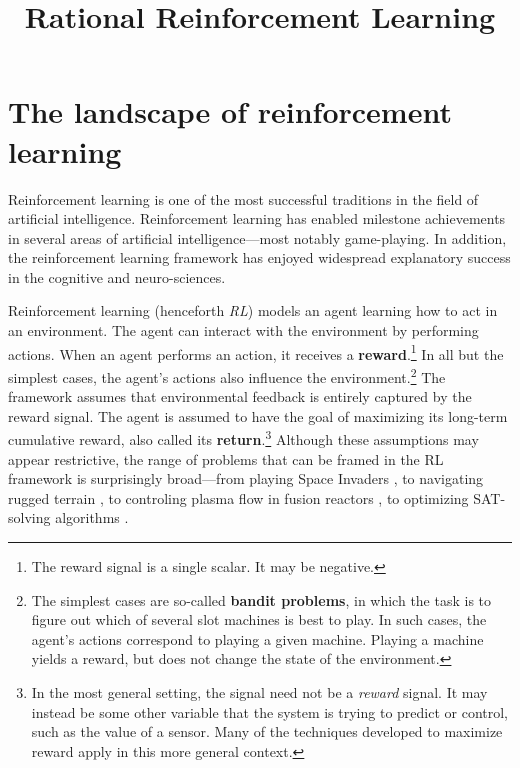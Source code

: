 \documentclass{my-tufte}
\title{Rational Reinforcement Learning}
\begin{document}
\maketitle

\section{The landscape of reinforcement learning}

Reinforcement learning is one of the most successful traditions in the field of artificial intelligence.
Reinforcement learning has enabled milestone achievements in several areas of artificial intelligence---most notably game-playing.
In addition, the reinforcement learning framework has enjoyed widespread explanatory success in the cognitive and neuro-sciences.

Reinforcement learning (henceforth \emph{RL}) models an agent learning how to act in an environment.
The agent can interact with the environment by performing actions.
When an agent performs an action, it receives a \textbf{reward}.\footnote{The reward signal is a single scalar. It may be negative.}
In all but the simplest cases, the agent's actions also influence the environment.\footnote{The simplest cases are so-called \textbf{bandit problems}, in which the task is to figure out which of several slot machines is best to play. In such cases, the agent's actions correspond to playing a given machine. Playing a machine yields a reward, but does not change the state of the environment.}
The framework assumes that environmental feedback is entirely captured by the reward signal.
The agent is assumed to have the goal of maximizing its long-term cumulative reward, also called its \textbf{return}.\footnote{In the most general setting, the signal need not be a \emph{reward} signal. It may instead be some other variable that the system is trying to predict or control, such as the value of a sensor. Many of the techniques developed to maximize reward apply in this more general context.}
Although these assumptions may appear restrictive, the range of problems that can be framed in the RL framework is surprisingly broad---from playing Space Invaders \parencite{mnihHumanlevelControlDeep2015}, to navigating rugged terrain \parencite{annurev:/content/journals/10.1146/annurev-control-030323-022510}, to controling plasma flow in fusion reactors \parencite{degraveMagneticControlTokamak2022}, to optimizing SAT-solving algorithms \parencite{fournierDeepReinforcementLearning2022}.
\end{document}
